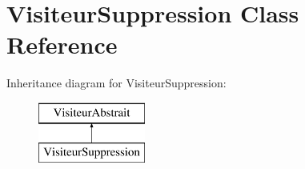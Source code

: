 \hypertarget{class_visiteur_suppression}{}\section{Visiteur\+Suppression Class Reference}
\label{class_visiteur_suppression}
Inheritance diagram for Visiteur\+Suppression\+:\begin{figure}[H]
\begin{center}
\leavevmode
\includegraphics[height=2.000000cm]{class_visiteur_suppression}
\end{center}
\end{figure}
